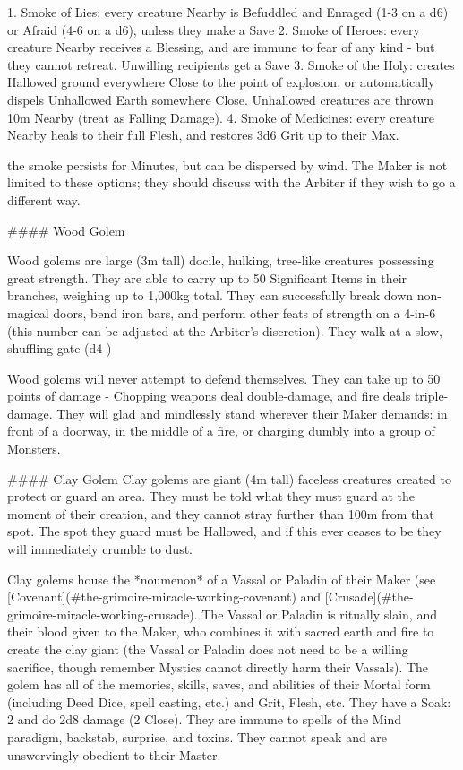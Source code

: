 1. Smoke of Lies:  every creature Nearby is Befuddled and Enraged (1-3 on a d6) or Afraid (4-6 on a d6), unless they make a Save
2. Smoke of Heroes:  every creature Nearby receives a Blessing, and are immune to fear of any kind - but they cannot retreat.  Unwilling recipients get a Save
3. Smoke of the Holy: creates Hallowed ground everywhere Close to the point of explosion, or automatically dispels Unhallowed Earth somewhere Close.  Unhallowed creatures are thrown 10m Nearby (treat as Falling Damage).
4. Smoke of Medicines: every creature Nearby heals to their full Flesh, and restores 3d6 Grit up to their Max.

the smoke persists for Minutes, but can be dispersed by wind.  The Maker is not limited to these options; they should discuss with the Arbiter if they wish to go a different way.



#### Wood Golem

Wood golems are large (3m tall) docile, hulking, tree-like creatures possessing great strength. They are able to carry up to 50 Significant Items in their branches, weighing up to 1,000kg total.  They can successfully break down non-magical doors, bend iron bars, and perform other feats of strength on a 4-in-6 (this number can be adjusted at the Arbiter's discretion).  They walk at a slow, shuffling gate (d4 \MD)

Wood golems will never attempt to defend themselves.  They can take up to 50 points of damage - Chopping weapons deal double-damage, and fire deals triple-damage.  They will glad and mindlessly stand wherever their Maker demands: in front of a doorway, in the middle of a fire, or charging dumbly into a group of Monsters.

#### Clay Golem
Clay golems are giant (4m tall) faceless creatures created to protect or guard an area.  They must be told what they must guard at the moment of their creation, and they cannot stray further than 100m from that spot.  The spot they guard must be Hallowed, and if this ever ceases to be they will immediately crumble to dust.

Clay golems house the *noumenon* of a Vassal or Paladin of their Maker (see [Covenant](#the-grimoire-miracle-working-covenant) and [Crusade](#the-grimoire-miracle-working-crusade).  The Vassal or Paladin is ritually slain, and their blood given to the Maker, who combines it with sacred earth and fire to create the clay giant (the Vassal or Paladin does not need to be a willing sacrifice, though remember Mystics cannot directly harm their Vassals).  The golem has all of the memories, skills, saves, and abilities of their Mortal form (including Deed Dice, spell casting, etc.) and Grit, Flesh, etc.  They have a Soak: 2 and do 2d8 damage (2 Close).  They are immune to spells of the Mind paradigm, backstab, surprise, and toxins. They cannot speak and are unswervingly obedient to their Master.

